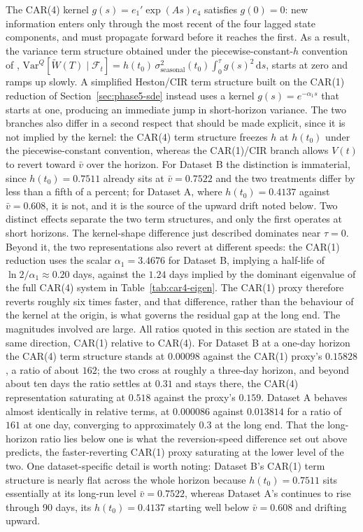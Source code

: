 \documentclass[11pt, a4paper, twoside]{article}
\begin{document}
The CAR(4) kernel $g(s) = e_1' \exp(As)e_4$ satisfies $g(0) = 0$: new information enters only through the most recent of the four lagged state components, and must propagate forward before it reaches the first. As a result, the variance term structure obtained under the piecewise-constant-$h$ convention of \citet{Tol1997}, $\mathrm{Var}^Q[\widetilde W(T)\mid\mathcal F_t] = h(t_0)\,\sigma^2_{\text{seasonal}}(t_0) \int_0^\tau g(s)^2\,\mathrm ds$, starts at zero and ramps up slowly. A simplified Heston/CIR term structure built on the CAR(1) reduction of Section~\ref{sec:phase5-sde} instead uses a kernel $g(s) = e^{-\alpha_1 s}$ that starts at one, producing an immediate jump in short-horizon variance. The two branches also differ in a second respect that should be made explicit, since it is not implied by the kernel: the CAR(4) term structure freezes $h$ at $h(t_0)$ under the piecewise-constant convention, whereas the CAR(1)/CIR branch allows $V(t)$ to revert toward $\bar v$ over the horizon. For Dataset B the distinction is immaterial, since $h(t_0) = 0.7511$ already sits at $\bar v = 0.7522$ and the two treatments differ by less than a fifth of a percent; for Dataset A, where $h(t_0) = 0.4137$ against $\bar v = 0.608$, it is not, and it is the source of the upward drift noted below. Two distinct effects separate the two term structures, and only the first operates at short horizons. The kernel-shape difference just described dominates near $\tau = 0$. Beyond it, the two representations also revert at different speeds: the CAR(1) reduction uses the scalar $\alpha_1 = 3.4676$ for Dataset B, implying a half-life of $\ln 2/\alpha_1 \approx 0.20$ days, against the $1.24$ days implied by the dominant eigenvalue of the full CAR(4) system in Table~\ref{tab:car4-eigen}. The CAR(1) proxy therefore reverts roughly six times faster, and that difference, rather than the behaviour of the kernel at the origin, is what governs the residual gap at the long end. The magnitudes involved are large. All ratios quoted in this section are stated in the same direction, CAR(1) relative to CAR(4). For Dataset B at a one-day horizon the CAR(4) term structure stands at $0.00098$ against the CAR(1) proxy's $0.15828$, a ratio of about $162$; the two cross at roughly a three-day horizon, and beyond about ten days the ratio settles at $0.31$ and stays there, the CAR(4) representation saturating at $0.518$ against the proxy's $0.159$. Dataset A behaves almost identically in relative terms, at $0.000086$ against $0.013814$ for a ratio of $161$ at one day, converging to approximately $0.3$ at the long end. That the long-horizon ratio lies below one is what the reversion-speed difference set out above predicts, the faster-reverting CAR(1) proxy saturating at the lower level of the two. One dataset-specific detail is worth noting: Dataset B's CAR(1) term structure is nearly flat across the whole horizon because $h(t_0) = 0.7511$ sits essentially at its long-run level $\bar v = 0.7522$, whereas Dataset A's continues to rise through 90 days, its $h(t_0) = 0.4137$ starting well below $\bar v = 0.608$ and drifting upward.
\end{document}
